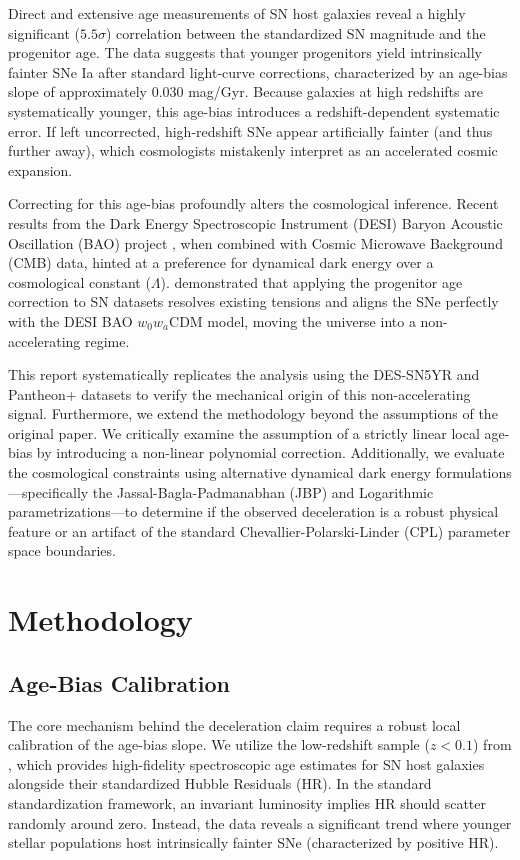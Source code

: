 \documentclass[12pt, a4paper]{article}
\begin{document}
Direct and extensive age measurements of SN host galaxies reveal a highly significant ($5.5\sigma$) correlation between the standardized SN magnitude and the progenitor age. The data suggests that younger progenitors yield intrinsically fainter SNe Ia after standard light-curve corrections, characterized by an age-bias slope of approximately $0.030$ mag/Gyr. Because galaxies at high redshifts are systematically younger, this age-bias introduces a redshift-dependent systematic error. If left uncorrected, high-redshift SNe appear artificially fainter (and thus further away), which cosmologists mistakenly interpret as an accelerated cosmic expansion.

Correcting for this age-bias profoundly alters the cosmological inference. Recent results from the Dark Energy Spectroscopic Instrument (DESI) Baryon Acoustic Oscillation (BAO) project \citep{desi2024}, when combined with Cosmic Microwave Background (CMB) data, hinted at a preference for dynamical dark energy over a cosmological constant ($\Lambda$). \citet{son2025} demonstrated that applying the progenitor age correction to SN datasets resolves existing tensions and aligns the SNe perfectly with the DESI BAO $w_0w_a$CDM model, moving the universe into a non-accelerating regime.

This report systematically replicates the \citet{son2025} analysis using the DES-SN5YR and Pantheon+ datasets to verify the mechanical origin of this non-accelerating signal. Furthermore, we extend the methodology beyond the assumptions of the original paper. We critically examine the assumption of a strictly linear local age-bias by introducing a non-linear polynomial correction. Additionally, we evaluate the cosmological constraints using alternative dynamical dark energy formulations \citep{arora2025}—specifically the Jassal-Bagla-Padmanabhan (JBP) and Logarithmic parametrizations—to determine if the observed deceleration is a robust physical feature or an artifact of the standard Chevallier-Polarski-Linder (CPL) parameter space boundaries.

\section{Methodology}

\subsection{Age-Bias Calibration}
The core mechanism behind the deceleration claim requires a robust local calibration of the age-bias slope. We utilize the low-redshift sample ($z < 0.1$) from \citet{rose2019}, which provides high-fidelity spectroscopic age estimates for SN host galaxies alongside their standardized Hubble Residuals (HR). In the standard standardization framework, an invariant luminosity implies HR should scatter randomly around zero. Instead, the data reveals a significant trend where younger stellar populations host intrinsically fainter SNe (characterized by positive HR).
\end{document}
